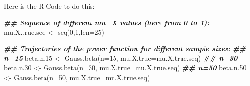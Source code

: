 \documentclass[
]{book}
\newenvironment{Shaded}{\begin{snugshade}}{\end{snugshade}}
\newcommand{\AttributeTok}[1]{\textcolor[rgb]{0.77,0.63,0.00}{#1}}
\newcommand{\DecValTok}[1]{\textcolor[rgb]{0.00,0.00,0.81}{#1}}
\newcommand{\DocumentationTok}[1]{\textcolor[rgb]{0.56,0.35,0.01}{\textbf{\textit{#1}}}}
\newcommand{\FloatTok}[1]{\textcolor[rgb]{0.00,0.00,0.81}{#1}}
\newcommand{\FunctionTok}[1]{\textcolor[rgb]{0.00,0.00,0.00}{#1}}
\newcommand{\NormalTok}[1]{#1}
\newcommand{\OtherTok}[1]{\textcolor[rgb]{0.56,0.35,0.01}{#1}}
\begin{document}
Here is the R-Code to do this:

\begin{Shaded}
\begin{Highlighting}[]
\DocumentationTok{\#\# Sequence of different mu\_X values (here from 0 to 1):}
\NormalTok{mu.X.true.seq   }\OtherTok{\textless{}{-}} \FunctionTok{seq}\NormalTok{(}\DecValTok{0}\NormalTok{,}\DecValTok{1}\NormalTok{,}\AttributeTok{len=}\DecValTok{25}\NormalTok{)}

\DocumentationTok{\#\# Trajectories of the power function for different sample sizes:}
\DocumentationTok{\#\# n=15}
\NormalTok{beta.n}\FloatTok{.15}       \OtherTok{\textless{}{-}} \FunctionTok{Gauss.beta}\NormalTok{(}\AttributeTok{n=}\DecValTok{15}\NormalTok{, }\AttributeTok{mu.X.true=}\NormalTok{mu.X.true.seq)}
\DocumentationTok{\#\# n=30}
\NormalTok{beta.n}\FloatTok{.30}       \OtherTok{\textless{}{-}} \FunctionTok{Gauss.beta}\NormalTok{(}\AttributeTok{n=}\DecValTok{30}\NormalTok{, }\AttributeTok{mu.X.true=}\NormalTok{mu.X.true.seq)}
\DocumentationTok{\#\# n=50}
\NormalTok{beta.n}\FloatTok{.50}       \OtherTok{\textless{}{-}} \FunctionTok{Gauss.beta}\NormalTok{(}\AttributeTok{n=}\DecValTok{50}\NormalTok{, }\AttributeTok{mu.X.true=}\NormalTok{mu.X.true.seq)}


\end{Highlighting}
\end{Shaded}
\end{document}
